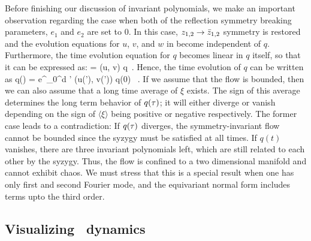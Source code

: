 \documentclass[aip,cha,
reprint,
secnumarabic,
nofootinbib, tightenlines,
nobibnotes, showkeys, showpacs,
superscriptaddress,
]{revtex4-1}
\begin{document}
Before finishing our discussion of invariant polynomials, we make an important 
observation regarding the case when both of the reflection symmetry breaking
parameters, $e_{1}$ and $e_2$ are set to $0$. In this case, 
$z_{1,2} \rightarrow \bar{z}_{1,2}$ symmetry is restored and the 
evolution equations for $u$, $v$, and $w$ in  become 
independent of $q$. Furthermore, the time evolution equation for $q$ becomes 
linear in $q$ itself, so that it can be expressed as:
\beq
     = \xi (u, v) q \,.
Hence, the time evolution of $q$ can be written as
\beq
    q(\zeit) =  e^{\int_0^\zeit d \zeit' \xi (u(\zeit'), v(\zeit'))} q(0) \, .
If we assume that the flow is bounded, then we can also assume that a long 
time average of $\xi$ exists. The sign of this average determines the long 
term behavior of $q(\tau)$; it will either diverge or vanish depending on the 
sign of $\langle \xi \rangle$ being positive or negative respectively. The 
former case leads to a contradiction: If $q(\tau)$ diverges, the 
symmetry-invariant flow cannot be bounded since the syzygy  
must be satisfied at all times. If $q(t)$ vanishes, there are three invariant 
polynomials left, which are still related to each other by the syzygy. Thus, 
the flow is confined to a two dimensional manifold and cannot exhibit chaos.
We must stress that this is a special result when one has only first and 
second Fourier mode, and the equivariant normal form includes terms upto the
third order.

\subsection{Visualizing \twomode\ dynamics}
\label{s:visual}
\end{document}

